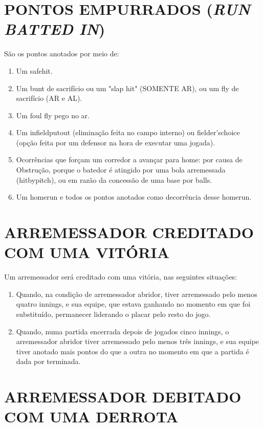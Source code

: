 	\section{PONTOS EMPURRADOS (\textit{RUN BATTED IN})}

		São os pontos anotados por meio de:

			\begin{enumerate}[label=(\alph*)]
				\item  Um \gls{safehit}.
				\item Um \gls{bunt} de sacrifício ou um "slap hit" (SOMENTE AR), ou um \gls{fly} de sacrifício (AR e AL).
				\item Um \gls{foul fly} pego no ar.
				\item Um \gls{infieldputout} (eliminação feita no campo interno) ou \gls{fielder'schoice} (opção feita por um defensor na hora de executar uma jogada).
				\item Ocorrências que forçam um corredor a avançar para \gls{home}: por causa de Obstrução, porque o batedor é atingido por uma bola arremessada (\gls{hitbypitch}), ou em razão da concessão de uma base por \glspl{ball}.
				\item Um \gls{homerun} e todos os pontos anotados como decorrência desse \gls{homerun}.
			\end{enumerate}

	\section{ARREMESSADOR CREDITADO COM UMA VITÓRIA}

		 Um arremessador será creditado com uma vitória, nas seguintes situações:
			\begin{enumerate}[label=(\alph*)]
				\item  Quando, na condição de arremessador abridor, tiver arremessado pelo menos quatro \glspl{inning}, e sua equipe, que estava ganhando no momento em que foi substituído, permanecer liderando o placar pelo resto do jogo.
				\item Quando, numa partida encerrada depois de jogados cinco \glspl{inning}, o arremessador abridor tiver arremessado pelo menos três \glspl{inning}, e sua equipe tiver anotado mais pontos do que a outra no momento em que a partida é dada por terminada.
			\end{enumerate}

	\section{ARREMESSADOR DEBITADO COM UMA DERROTA}

